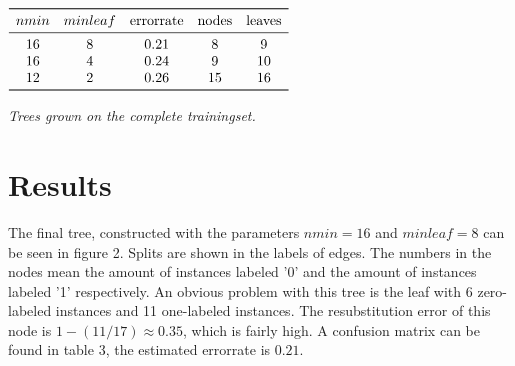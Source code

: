 \documentclass[a4paper,12pt]{scrartcl}
\begin{document}
    \begin{table}[!htb]
    \small  

        \centering
        $\begin{array}{ *{5}{c} }
            \toprule
            nmin & minleaf & \text{errorrate} & \text{nodes} & \text{leaves} \\
            \midrule
                16 & 8 & 0.21 & 8 & 9 \\
                16 & 4 & 0.24 & 9 & 10 \\
                12 & 2 & 0.26 & 15 & 16 \\
            \bottomrule
        \end{array}$
        \caption{\textit{Trees grown on the complete trainingset.}}
    \end{table}

\clearpage
\section{Results}
The final tree, constructed with the parameters $nmin=16$ and $minleaf=8$ can be seen in figure 2. Splits are shown in the labels of edges. The numbers in the nodes mean the amount of instances labeled '0' and the amount of instances labeled '1' respectively. An obvious problem with this tree is the leaf with 6 zero-labeled instances and 11 one-labeled instances. The resubstitution error of this node is $1 - (11/17) \approx 0.35$, which is fairly high. A confusion matrix can be found in table 3, the estimated errorrate is $0.21$.
\\\\
\end{document}
